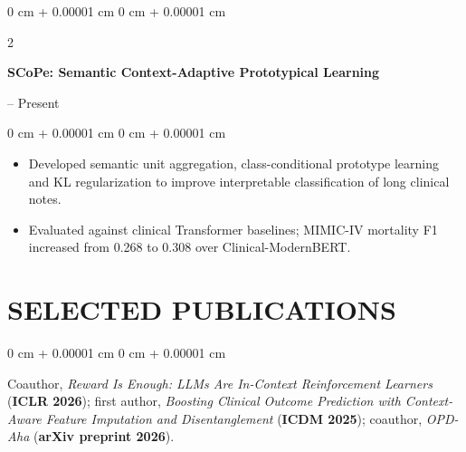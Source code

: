\documentclass[10pt, letterpaper]{article}
\newenvironment{highlights}{
    \begin{itemize}[
        topsep=0.03 cm,
        parsep=0.03 cm,
        partopsep=0pt,
        itemsep=0pt,
        leftmargin=0 cm + 10pt
    ]
}{
    \end{itemize}
} %
\newenvironment{onecolentry}{
    \begin{adjustwidth}{
        0 cm + 0.00001 cm
    }{
        0 cm + 0.00001 cm
    }
}{
    \end{adjustwidth}
} %
\newenvironment{twocolentry}[2][]{
    \onecolentry
    \def\secondColumn{#2}
    \setcolumnwidth{\fill, 4.5 cm}
    \begin{paracol}{2}
}{
    \switchcolumn \raggedleft \secondColumn
    \end{paracol}
    \endonecolentry
} %
\begin{document}
\begin{twocolentry}{2026 -- Present}
\textbf{SCoPe: Semantic Context-Adaptive Prototypical Learning}
\end{twocolentry}
\begin{onecolentry}
\begin{highlights}
\item Developed semantic unit aggregation, class-conditional prototype learning and KL regularization to improve interpretable classification of long clinical notes.
\item Evaluated against clinical Transformer baselines; MIMIC-IV mortality F1 increased from 0.268 to 0.308 over Clinical-ModernBERT.
\end{highlights}
\end{onecolentry}
\vspace{0.035 cm}
\section{SELECTED PUBLICATIONS}
\begin{onecolentry}
Coauthor, \textit{Reward Is Enough: LLMs Are In-Context Reinforcement Learners} (\textbf{ICLR 2026}); first author, \textit{Boosting Clinical Outcome Prediction with Context-Aware Feature Imputation and Disentanglement} (\textbf{ICDM 2025}); coauthor, \textit{OPD-Aha} (\textbf{arXiv preprint 2026}).
\end{onecolentry}
\end{document}
